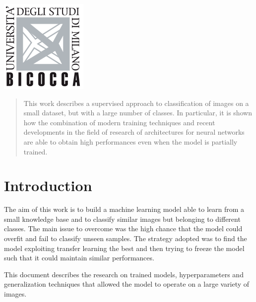 \begin{titlepage}

\includegraphics{logo.png}\\[1cm] %
 

\vfill %

\end{titlepage}


\begin{abstract}
This work describes a supervised approach to classification of images on a small dataset, but with a large number of classes. In particular, it is shown how the
combination of modern training techniques and recent developments
in the field of research of architectures for neural networks are able
to obtain high performances even when the model is partially trained.
\end{abstract}

\section{Introduction}


The aim of this work is to build a machine learning model able to learn from a small knowledge base and to classify similar images but belonging to different classes.
The main issue to overcome was the high chance that the model could overfit and fail to classify unseen samples. 
The strategy adopted was to find the model exploiting transfer learning the best and then trying to freeze the model such that it could maintain similar performances. \par
This document describes the research on trained models, hyperparameters and generalization techniques that allowed the model to operate on a large variety of images. 






